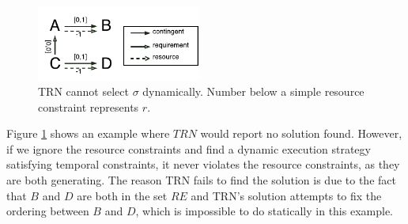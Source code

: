\begin{figure}[H]
\begin{center}
\includegraphics[width=0.48\textwidth,trim={0.23cm 0.23cm 0.00cm 0.37cm},clip]{stnu_counter}
\caption{TRN cannot select $\sigma$ dynamically. Number below a  simple resource constraint represents $r$.}
\label{fig:stnu_counter}
\end{center}
\end{figure}

\vspace{10mm}

Figure \ref{fig:stnu_counter} shows an example where $TRN$ would report no solution found. However, if we ignore the resource constraints and find a dynamic execution strategy satisfying temporal constraints, it never violates the resource constraints, as they are both generating. The reason TRN fails to find the solution is due to the fact that $B$ and $D$ are both in the set $RE$ and TRN's solution attempts to fix the ordering between $B$ and $D$, which is impossible to do statically in this example.


